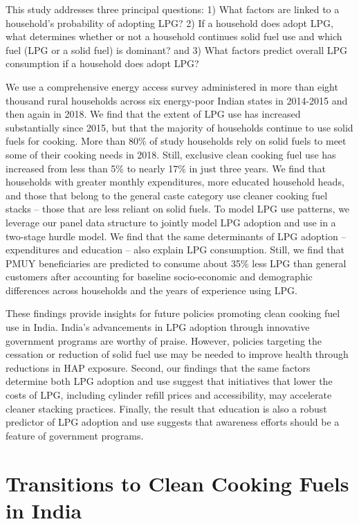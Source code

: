 \documentclass[11pt,english]{article}
\theoremstyle{plain} \newtheorem{claim}{Claim}
\theoremstyle{plain} \newtheorem{prop}{Proposition}
\theoremstyle{plain} \newtheorem{hypo}{Hypothesis}
\begin{document}
This study addresses three principal questions: 1) What factors are linked to a household's probability of adopting LPG? 2) If a household does adopt LPG, what determines whether or not a household continues solid fuel use and which fuel (LPG or a solid fuel) is dominant? and 3) What factors predict overall LPG consumption if a household does adopt LPG? 

We use a comprehensive energy access survey administered in more than eight thousand rural households across six energy-poor Indian states in 2014-2015 and then again in 2018. We find that the extent of LPG use has increased substantially since 2015, but that the majority of households continue to use solid fuels for cooking. More than 80\% of study households rely on solid fuels to meet some of their cooking needs in 2018. Still, exclusive clean cooking fuel use has increased from less than 5\% to nearly 17\% in just three years. We find that households with greater monthly expenditures, more educated household heads, and those that belong to the general caste category use cleaner cooking fuel stacks -- those that are less reliant on solid fuels. To model LPG use patterns, we leverage our panel data structure to jointly model LPG adoption and use in a two-stage hurdle model. We find that the same determinants of LPG adoption -- expenditures and education -- also explain LPG consumption. Still, we find that PMUY beneficiaries are predicted to consume about 35\% less LPG than general customers after accounting for baseline socio-economic and demographic differences across households and the years of experience using LPG. 

These findings provide insights for future policies promoting clean cooking fuel use in India. India's advancements in LPG adoption through innovative government programs are worthy of praise. However, policies targeting the cessation or reduction of solid fuel use may be needed to improve health through reductions in HAP exposure. Second, our findings that the same factors determine both LPG adoption and use suggest that initiatives that lower the costs of LPG, including cylinder refill prices and accessibility, may accelerate cleaner stacking practices. Finally, the result that education is also a robust predictor of LPG adoption and use suggests that awareness efforts should be a feature of government programs.


\section*{Transitions to Clean Cooking Fuels in India}
\end{document}
